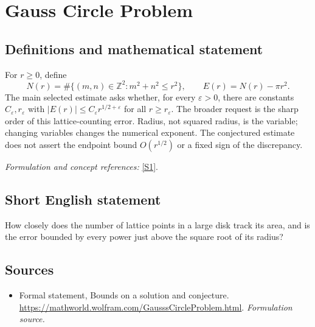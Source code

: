 \documentclass[11pt]{article}
\begin{document}
\section*{\texorpdfstring{Gauss Circle Problem}{Gauss Circle Problem}}\label{260}
\subsection{Definitions and mathematical statement}
For $r\ge0$, define
\[
 N(r)=\#\{(m,n)\in{\mathbb{Z}}^2:m^2+n^2\le r^2\},\qquad E(r)=N(r)-\pi r^2.
\]
The main selected estimate asks whether, for every ${\varepsilon}>0$, there are constants $C_{\varepsilon},r_{\varepsilon}$ with
$|E(r)|\le C_{\varepsilon} r^{1/2+{\varepsilon}}$ for all $r\ge r_{\varepsilon}$.
The broader request is the sharp order of this lattice-counting error. Radius, not squared radius, is the variable; changing variables changes the numerical exponent. The conjectured estimate does not assert the endpoint bound $O(r^{1/2})$ or a fixed sign of the discrepancy.
\par\smallskip\textit{Formulation and concept references:} \href{https://mathworld.wolfram.com/GausssCircleProblem.html}{[S1]}.

\subsection{Short English statement}
How closely does the number of lattice points in a large disk track its area, and is the error bounded by every power just above the square root of its radius?
\subsection{Sources}
\begin{itemize}
\item[S1]Formal statement, Bounds on a solution and conjecture.
\url{https://mathworld.wolfram.com/GausssCircleProblem.html}.
\textit{Formulation source.}
\end{itemize}
\end{document}
